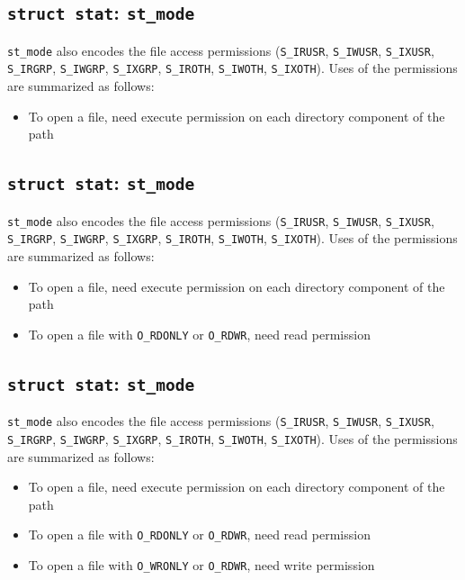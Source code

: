 \documentclass[xga]{xdvislides}
\begin{document}
\subsection{{\tt struct stat}: {\tt st\_mode}}
{\tt st\_mode} also encodes the file access permissions ({\tt S\_IRUSR},
{\tt S\_IWUSR}, {\tt S\_IXUSR}, {\tt S\_IRGRP}, {\tt S\_IWGRP}, {\tt S\_IXGRP},
{\tt S\_IROTH}, {\tt S\_IWOTH}, {\tt S\_IXOTH}).  Uses of the permissions are
summarized as follows:

\begin{itemize}
	\item To open a file, need execute permission on each directory component of the path
\end{itemize}

\subsection{{\tt struct stat}: {\tt st\_mode}}
{\tt st\_mode} also encodes the file access permissions ({\tt S\_IRUSR},
{\tt S\_IWUSR}, {\tt S\_IXUSR}, {\tt S\_IRGRP}, {\tt S\_IWGRP}, {\tt S\_IXGRP},
{\tt S\_IROTH}, {\tt S\_IWOTH}, {\tt S\_IXOTH}).  Uses of the permissions are
summarized as follows:

\begin{itemize}
	\item To open a file, need execute permission on each directory component of the path
	\item To open a file with {\tt O\_RDONLY} or {\tt O\_RDWR}, need read permission
\end{itemize}

\subsection{{\tt struct stat}: {\tt st\_mode}}
{\tt st\_mode} also encodes the file access permissions ({\tt S\_IRUSR},
{\tt S\_IWUSR}, {\tt S\_IXUSR}, {\tt S\_IRGRP}, {\tt S\_IWGRP}, {\tt S\_IXGRP},
{\tt S\_IROTH}, {\tt S\_IWOTH}, {\tt S\_IXOTH}).  Uses of the permissions are
summarized as follows:

\begin{itemize}
	\item To open a file, need execute permission on each directory component of the path
	\item To open a file with {\tt O\_RDONLY} or {\tt O\_RDWR}, need read permission
	\item To open a file with {\tt O\_WRONLY} or {\tt O\_RDWR}, need write permission
\end{itemize}
\end{document}
